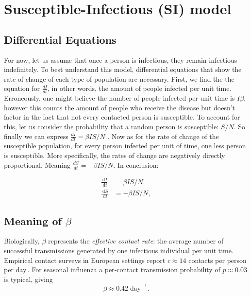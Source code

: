 \documentclass[11pt]{article}
\newcommand{\dd}{\,\mathrm{d}}
\begin{document}
\section{Susceptible-Infectious (SI) model} \label{sec:SI}
\subsection*{Differential Equations }
For now, let us assume that once a person is infectious, they remain infectious indefinitely. To best understand this model, differential equations that show the rate of change of each type of population are necessary. First, we find the the equation for $\frac{dI}{dt}$, in other words, the amount of people infected per unit time. Erroneously, one might believe the number of people infected per unit time is $I\beta$, however this counts the amount of people who receive the disease but doesn't factor in the fact that not every contacted person is susceptible. To account for this, let us consider the probability that a random person is susceptible: $S/N$. So finally we can express $\frac{dI}{dt}=\beta I S/N$ . Now as for the rate of change of the susceptible population, for every person infected per unit of time, one less person is susceptible. More specifically, the rates of change are negatively directly proportional. Meaning $\frac{dS}{dt}=-\beta I S/N$. In conclusion:

\begin{subequations}\label{eq:SIeqs}
\begin{align}
  \frac{\dd I}{\dd t} &=  \beta I S/N. \label{eq:SIeqsI}\\ 
  \frac{\dd S}{\dd t} &= -\beta I S/N, \label{eq:SIeqsS}
\end{align}
\end{subequations}
\subsection*{Meaning of \(\beta\)}
Biologically, \(\beta\) represents the \emph{effective contact rate}: the average number of successful transmissions generated by one infectious individual per unit time. Empirical contact surveys in European settings report $c\approx14$ contacts per person per day\,\citep{Mossong2008}.  For seasonal influenza a per‑contact transmission probability of $p\approx0.03$ is typical, giving
\begin{equation*} 
  \beta\approx0.42\;\text{day}^{-1}.
\end{equation*} 
\end{document}
